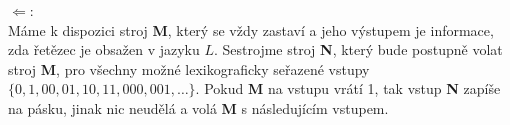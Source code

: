\documentclass[12pt, a4paper]{article}
\begin{document}
$\Leftarrow$:\\
Máme k dispozici stroj \textbf{M}, který se vždy zastaví a jeho výstupem je informace, zda řetězec je obsažen v jazyku $L$. Sestrojme stroj \textbf{N}, který bude postupně volat stroj \textbf{M}, pro všechny možné lexikograficky seřazené vstupy $\{0,1,00,01,10,11,000,001,\dots\}$. Pokud \textbf{M} na vstupu vrátí 1, tak vstup \textbf{N} zapíše na pásku, jinak nic neudělá a volá \textbf{M} s následujícím vstupem.
\end{document}
